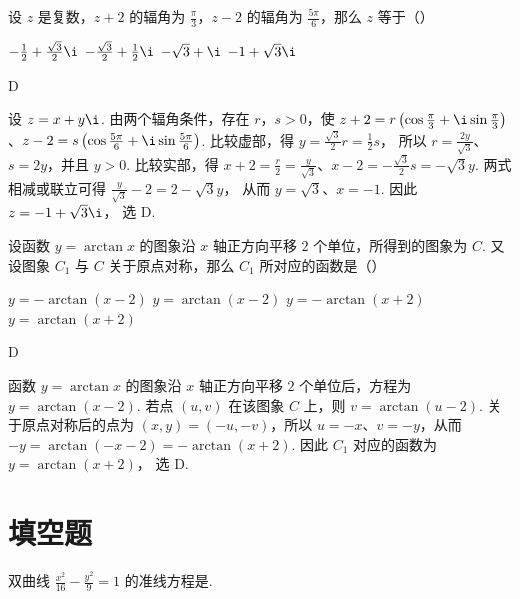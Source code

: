 \begin{problem}
设 \(z\) 是复数，\(z + 2\) 的辐角为 \(\frac{\pi}{3}\)，\(z - 2\) 的辐角为 \(\frac{5\pi}{6}\)，那么 \(z\) 等于（\quad）

\choices
    {\(-\frac{1}{2}+\frac{\sqrt{3}}{2}\i\)}
    {\(-\frac{\sqrt{3}}{2}+\frac{1}{2}\i\)}
    {\(-\sqrt{3}+\i\)}
    {\(-1+\sqrt{3}\i\)}
\end{problem}

\begin{answer}
D
\end{answer}

\begin{solution}
	设 \(z=x+y\i\). 由两个辐角条件，存在 \(r\)，\(s>0\)，使
\(z+2=r\left(\cos\frac{\pi}{3}+\i\sin\frac{\pi}{3}\right)\)、\(z-2=s\left(\cos\frac{5\pi}{6}+\i\sin\frac{5\pi}{6}\right)\).
比较虚部，得
\(y=\frac{\sqrt{3}}{2}r=\frac12s\)，
所以 \(r=\frac{2y}{\sqrt{3}}\)、\(s=2y\)，并且 \(y>0\). 比较实部，得
\(x+2=\frac r2=\frac{y}{\sqrt{3}}\)、\(x-2=-\frac{\sqrt{3}}2s=-\sqrt{3}y\).
两式相减或联立可得
\(\frac{y}{\sqrt{3}}-2=2-\sqrt{3}y\)，
从而 \(y=\sqrt{3}\)、\(x=-1\). 因此 \(z=-1+\sqrt{3}\i\)，
选 D.
\end{solution}

\begin{problem}
设函数 \(y=\arctan x\) 的图象沿 \(x\) 轴正方向平移 \(2\) 个单位，所得到的图象为 \(C\). 又设图象 \(C_1\) 与 \(C\) 关于原点对称，那么 \(C_1\) 所对应的函数是（\quad）

\choices
    {\(y=-\arctan(x-2)\)}
    {\(y=\arctan(x-2)\)}
    {\(y=-\arctan(x+2)\)}
    {\(y=\arctan(x+2)\)}
\end{problem}

\begin{answer}
D
\end{answer}

\begin{solution}
函数 \(y=\arctan x\) 的图象沿 \(x\) 轴正方向平移 \(2\) 个单位后，方程为
\(y=\arctan(x-2)\).
若点 \((u,v)\) 在该图象 \(C\) 上，则 \(v=\arctan(u-2)\). 关于原点对称后的点为 \((x,y)=(-u,-v)\)，所以 \(u=-x\)、\(v=-y\)，从而
\(-y=\arctan(-x-2)=-\arctan(x+2)\).
因此 \(C_1\) 对应的函数为
\(y=\arctan(x+2)\)，
选 D.
\end{solution}

\section{填空题}

\begin{problem}
双曲线 \(\frac{x^2}{16} - \frac{y^2}{9} = 1\) 的准线方程是\fillinblank{}.
\end{problem}

